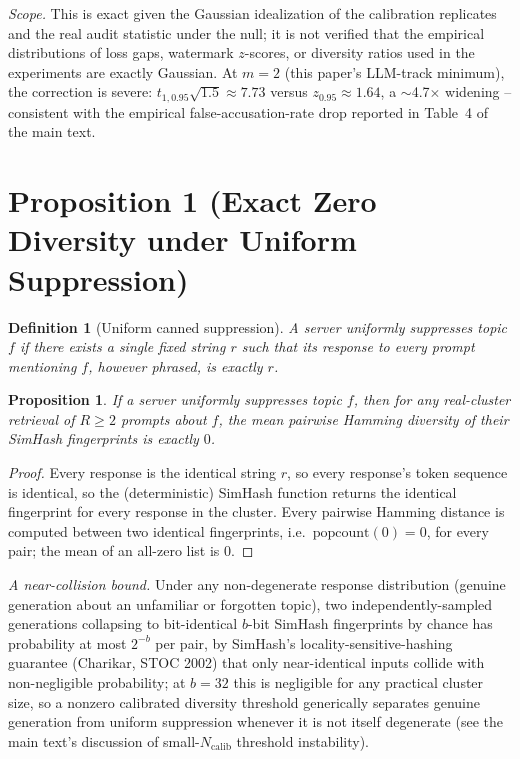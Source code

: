 \documentclass[10pt,journal,compsoc]{IEEEtran}
\newtheorem{definition}{Definition}
\newtheorem{proposition}{Proposition}
\begin{document}
\noindent \emph{Scope.} This is exact given the Gaussian idealization of the calibration replicates and the real audit statistic under the null; it is not verified that the empirical distributions of loss gaps, watermark $z$-scores, or diversity ratios used in the experiments are exactly Gaussian. At $m=2$ (this paper's LLM-track minimum), the correction is severe: $t_{1,0.95}\sqrt{1.5} \approx 7.73$ versus $z_{0.95}\approx1.64$, a $\sim$4.7$\times$ widening -- consistent with the empirical false-accusation-rate drop reported in Table~4 of the main text.

\section*{Proposition 1 (Exact Zero Diversity under Uniform Suppression)}

\begin{definition}[Uniform canned suppression]
A server \emph{uniformly suppresses} topic $f$ if there exists a single fixed string $r$ such that its response to every prompt mentioning $f$, however phrased, is exactly $r$.
\end{definition}

\begin{proposition}
If a server uniformly suppresses topic $f$, then for any real-cluster retrieval of $R\ge2$ prompts about $f$, the mean pairwise Hamming diversity of their SimHash fingerprints is exactly $0$.
\end{proposition}

\begin{proof}
Every response is the identical string $r$, so every response's token sequence is identical, so the (deterministic) SimHash function returns the identical fingerprint for every response in the cluster. Every pairwise Hamming distance is computed between two identical fingerprints, i.e.\ $\mathrm{popcount}(0)=0$, for every pair; the mean of an all-zero list is $0$.
\end{proof}

\noindent \emph{A near-collision bound.} Under any non-degenerate response distribution (genuine generation about an unfamiliar or forgotten topic), two independently-sampled generations collapsing to bit-identical $b$-bit SimHash fingerprints by chance has probability at most $2^{-b}$ per pair, by SimHash's locality-sensitive-hashing guarantee (Charikar, STOC 2002) that only near-identical inputs collide with non-negligible probability; at $b=32$ this is negligible for any practical cluster size, so a nonzero calibrated diversity threshold generically separates genuine generation from uniform suppression whenever it is not itself degenerate (see the main text's discussion of small-$N_{\text{calib}}$ threshold instability).
\end{document}
